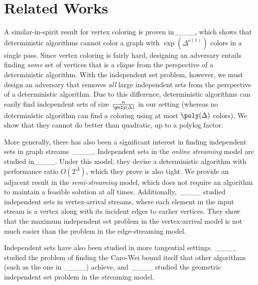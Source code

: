 \section{Related Works}
A similar-in-spirit result for vertex coloring is proven in____, which shows that deterministic algorithms cannot color a graph with $\exp(\Delta^{o(1)})$ colors in a single pass. Since vertex coloring is fairly hard, designing an adversary entails finding \textit{some} set of vertices that is a clique from the perspective of a deterministic algorithm. With the independent set problem, however, we must design an adversary that removes \textit{all} large independent sets from the perspective of a deterministic algorithm. Due to this difference, deterministic algorithms can easily find independent sets of size $\frac n{\poly(\Delta)}$ in our setting (whereas no deterministic algorithm can find a coloring using at most $\poly(\Delta)$ colors). We show that they cannot do better than quadratic, up to a polylog factor. 

More generally, there has also been a significant interest in finding independent sets in graph streams\ ____. Independent sets in the \textit{online streaming} model are studied in____. Under this model, they devise a deterministic algorithm with performance ratio $O(2^{\Delta})$, which they prove is also tight. We provide an adjacent result in the \textit{semi-streaming} model, which does not require an algorithm to maintain a feasible solution at all times. Additionally,\ ____ studied independent sets in vertex-arrival streams, where each element in the input stream is a vertex along with its incident edges to earlier vertices. They show that the maximum independent set problem in the vertex-arrival model is not much easier than the problem in the edge-streaming model. 

Independent sets have also been studied in more tangential settings.\ ____ studied the problem of finding the Caro-Wei bound itself that other algorithms (such as the one in\ ____) achieve, and\ ____ studied the geometric independent set problem in the streaming model.